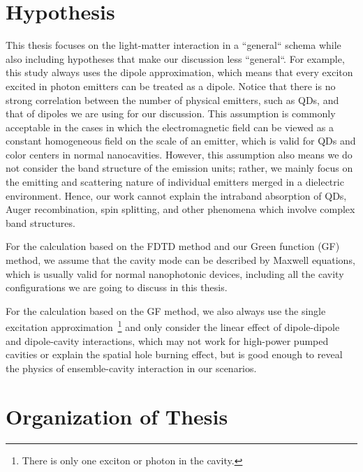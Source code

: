 \section{Hypothesis}
This thesis focuses on the light-matter interaction in a ``general`` schema while also including hypotheses that make our discussion less ``general``. For example, this study always uses the dipole approximation, which means that every exciton excited in photon emitters can be treated as a dipole. Notice that there is no strong correlation between the number of physical emitters, such as QDs, and that of dipoles we are using for our discussion. This assumption is commonly acceptable in the cases in which the electromagnetic field can be viewed as a constant homogeneous field on the scale of an emitter, which is valid for QDs and color centers in normal nanocavities. However, this assumption also means we do not consider the band structure of the emission units; rather, we mainly focus on the emitting and scattering nature of individual emitters merged in a dielectric environment. Hence, our work cannot explain the intraband absorption of QDs, Auger recombination, spin splitting, and other phenomena which involve complex band structures.

For the calculation based on the FDTD method and our Green function (GF) method, we assume that the cavity mode can be described by Maxwell equations, which is usually valid for normal nanophotonic devices, including all the cavity configurations we are going to discuss in this thesis.

For the calculation based on the GF method, we also always use the single excitation approximation~\footnote{There is only one exciton or photon in the cavity.} and only consider the linear effect of dipole-dipole and dipole-cavity interactions, which may not work for high-power pumped cavities or explain the spatial hole burning effect, but is good enough to reveal the physics of ensemble-cavity interaction in our scenarios.




\section{Organization of Thesis}

